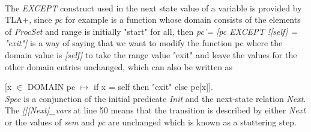 \documentclass{thesul}
\begin{document}
\hfill\\
The \textit{EXCEPT} construct used in the next state value of a variable is provided by TLA+, since \textit{pc} for example is a function whose domain consists of the elements of \textit{ProcSet} and range is initially "start" for all, then \textit{pc'= [pc EXCEPT ![self] = "exit"]} is a way of saying that we want to modify the function pc where the domain value is \textit{[self]} to take the range value "exit" and leave the values for the other domain entries unchanged, which can also be written as

[x $\in$ DOMAIN pc $\longmapsto$ if x = self then "exit" else pc[x]].
\hfill\\

\textit{Spec} is a conjunction of the initial predicate \textit{Init} and the next-state relation \textit{Next}. The \textit{[][Next]\_{vars}} at line 50 means that the transition is described by either \textit{Next} or the values of \textit{sem} and \textit{pc} are unchanged which is known as a stuttering step.
\end{document}
